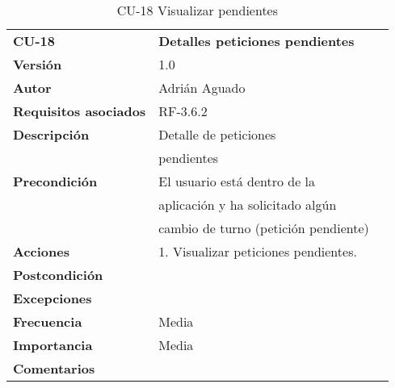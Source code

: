 \begin{table}[H]
\begin{tabular}{llr}  
\toprule
\begin{minipage}[b]{0.24\columnwidth}\raggedright\strut
\textbf{CU-18}\strut
\end{minipage} & \begin{minipage}[b]{0.72\columnwidth}\raggedright\strut
\textbf{Detalles peticiones pendientes}\strut
\end{minipage}\tabularnewline
\cmidrule(r){1-2}
\textbf{Versión}       & 1.0           \\
\textbf{Autor}       & Adrián  Aguado    \\
\textbf{Requisitos asociados}       & RF-3.6.2  \\
\textbf{Descripción} & Detalle de peticiones \\
& pendientes \\
\textbf{Precondición}  & El usuario está dentro de la \\
& aplicación y ha solicitado algún   \\
& cambio de turno (petición pendiente)   \\
\textbf{Acciones} & 1. Visualizar peticiones pendientes. \\
\textbf{Postcondición} &  \\
\textbf{Excepciones} &     \\
\textbf{Frecuencia} & Media          \\
\textbf{Importancia} & Media           \\
\textbf{Comentarios } &   \\
\bottomrule
\end{tabular}
\caption{CU-18 Visualizar pendientes} 
\end{table}

